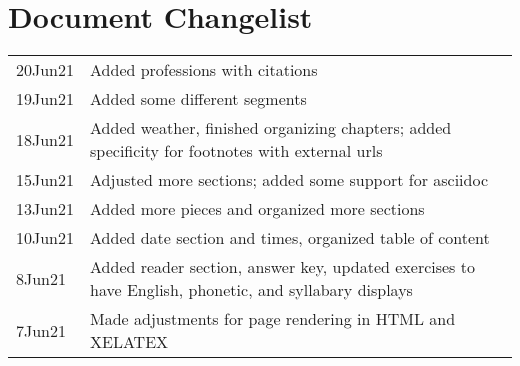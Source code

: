 \chapter{Document Changelist}
\begin{tabular}{p{3cm} p{11cm}}
20Jun21 & Added professions with citations\\
19Jun21 & Added some different segments \\
18Jun21 & Added weather, finished organizing chapters; added specificity for footnotes with external urls\\
15Jun21 & Adjusted more sections; added some support for asciidoc\\
13Jun21 & Added more pieces and organized more sections \\
10Jun21 & Added date section and times, organized table of content\\
8Jun21 & Added reader section, answer key, updated exercises to have English, phonetic, and syllabary displays \\
7Jun21 & Made adjustments for page rendering in HTML and XELATEX
\end{tabular}